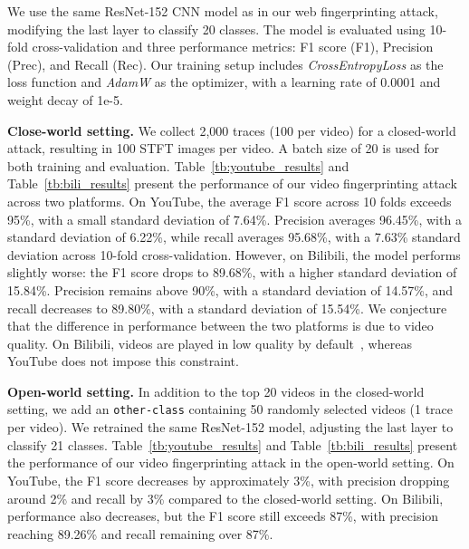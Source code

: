 We use the same ResNet-152 CNN model as in our web fingerprinting attack, modifying the last layer to classify 20 classes. The model is evaluated using 10-fold cross-validation and three performance metrics: F1 score (F1), Precision (Prec), and Recall (Rec). Our training setup includes \textit{CrossEntropyLoss} as the loss function and \textit{AdamW} as the optimizer, with a learning rate of 0.0001 and weight decay of 1e-5.

\textbf{{Close-world setting.}} We collect 2,000 traces (100 per video) for a closed-world attack, resulting in 100 STFT images per video. A batch size of 20 is used for both training and evaluation. Table~\ref{tb:youtube_results} and Table~\ref{tb:bili_results} present the performance of our video fingerprinting attack across two platforms. On YouTube, the average F1 score across 10 folds exceeds 95\%, with a small standard deviation of 7.64\%. Precision averages 96.45\%, with a standard deviation of 6.22\%, while recall averages 95.68\%, with a 7.63\% standard deviation across 10-fold cross-validation. However, on Bilibili, the model performs slightly worse: the F1 score drops to 89.68\%, with a higher standard deviation of 15.84\%. Precision remains above 90\%, with a standard deviation of 14.57\%, and recall decreases to 89.80\%, with a standard deviation of 15.54\%. We conjecture that the difference in performance between the two platforms is due to video quality. On Bilibili, videos are played in low quality by default~\cite{zhang2023multi}, whereas YouTube does not impose this constraint. 


\textbf{{Open-world setting.}} In addition to the top 20 videos in the closed-world setting, we add an \texttt{other-class} containing 50 randomly selected videos (1 trace per video). We retrained the same ResNet-152 model, adjusting the last layer to classify 21 classes. Table~\ref{tb:youtube_results} and Table~\ref{tb:bili_results} present the performance of our video fingerprinting attack in the open-world setting. On YouTube, the F1 score decreases by approximately 3\%, with precision dropping around 2\% and recall by 3\% compared to the closed-world setting. On Bilibili, performance also decreases, but the F1 score still exceeds 87\%, with precision reaching 89.26\% and recall remaining over 87\%.



